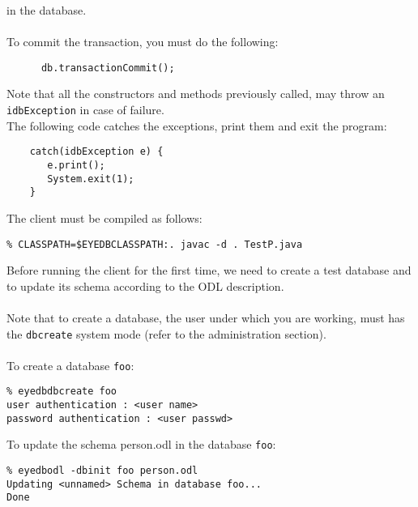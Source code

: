 in the database.
\\
\\
To commit the transaction, you must do the following:
{\verbsize \begin{verbatim}
      db.transactionCommit();
\end{verbatim}
}
Note that all the constructors and methods previously called, may
throw an \texttt{idbException} in case of failure.
\\
The following code catches the exceptions, print them and exit the program:
{\verbsize \begin{verbatim}
    catch(idbException e) {
       e.print();
       System.exit(1);
    }
\end{verbatim}
}

The client must be compiled as follows:
{\verbsize \begin{verbatim}
% CLASSPATH=$EYEDBCLASSPATH:. javac -d . TestP.java
\end{verbatim}
}
Before running the client for the first time, we need to create a test database
and to update its schema according to the ODL description.
\\
\\
Note that to create a database, the \eyedb user under which you are working,
must has the \texttt{dbcreate} system mode (refer to the administration
section).
\\
\\
To create a database \texttt{foo}:
\verbsize \begin{verbatim}
% eyedbdbcreate foo
user authentication : <user name>
password authentication : <user passwd>
\end{verbatim}
\normalsize
To update the schema person.odl in the database \texttt{foo}:
{\verbsize \begin{verbatim}
% eyedbodl -dbinit foo person.odl
Updating <unnamed> Schema in database foo...
Done
\end{verbatim}
}

